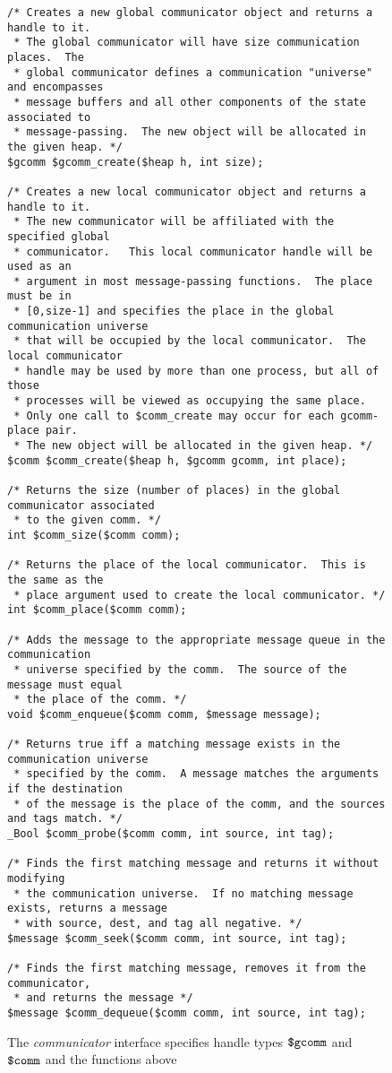 \begin{figure}
  \begin{small}
\begin{verbatim}
/* Creates a new global communicator object and returns a handle to it.
 * The global communicator will have size communication places.  The
 * global communicator defines a communication "universe" and encompasses
 * message buffers and all other components of the state associated to
 * message-passing.  The new object will be allocated in the given heap. */
$gcomm $gcomm_create($heap h, int size);

/* Creates a new local communicator object and returns a handle to it.
 * The new communicator will be affiliated with the specified global
 * communicator.   This local communicator handle will be used as an
 * argument in most message-passing functions.  The place must be in
 * [0,size-1] and specifies the place in the global communication universe
 * that will be occupied by the local communicator.  The local communicator
 * handle may be used by more than one process, but all of those
 * processes will be viewed as occupying the same place.
 * Only one call to $comm_create may occur for each gcomm-place pair.
 * The new object will be allocated in the given heap. */
$comm $comm_create($heap h, $gcomm gcomm, int place);

/* Returns the size (number of places) in the global communicator associated
 * to the given comm. */
int $comm_size($comm comm);

/* Returns the place of the local communicator.  This is the same as the
 * place argument used to create the local communicator. */
int $comm_place($comm comm);

/* Adds the message to the appropriate message queue in the communication
 * universe specified by the comm.  The source of the message must equal
 * the place of the comm. */
void $comm_enqueue($comm comm, $message message);

/* Returns true iff a matching message exists in the communication universe
 * specified by the comm.  A message matches the arguments if the destination
 * of the message is the place of the comm, and the sources and tags match. */
_Bool $comm_probe($comm comm, int source, int tag);

/* Finds the first matching message and returns it without modifying
 * the communication universe.  If no matching message exists, returns a message
 * with source, dest, and tag all negative. */
$message $comm_seek($comm comm, int source, int tag);

/* Finds the first matching message, removes it from the communicator,
 * and returns the message */ 
$message $comm_dequeue($comm comm, int source, int tag);
\end{verbatim}
  \end{small}
  \caption{The \emph{communicator} interface specifies handle 
    types $\mbox{\texttt{\${}gcomm}}$ and $\mbox{\texttt{\${}comm}}$ and the functions above}
  \label{fig:comm}
\end{figure}

